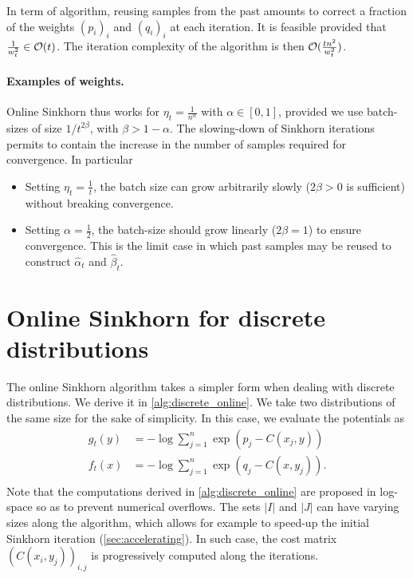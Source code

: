 In term of algorithm, reusing samples from the past amounts to correct a fraction of the weights
$(p_i)_i$ and $(q_i)_i$ at each iteration. It is feasible provided that $\frac{1}{w_t^2} \in \mathcal{O}(t)$. The iteration complexity of the algorithm is then
$\mathcal{O}(\frac{t n^2}{w_t^2})$.

\paragraph{Examples of weights.}

Online Sinkhorn thus works for  $\eta_t = \frac{1}{n^\alpha}$ with $\alpha \in
[0, 1]$, provided we use batch-sizes of size $1 / t^{2\beta}$, with $\beta
> 1 - \alpha$. The slowing-down of Sinkhorn iterations permits to contain the
increase in the number of samples required for convergence. In particular
\begin{itemize}
    \item Setting $\eta_t = \frac{1}{t}$, the batch size can grow arbitrarily slowly ($2
    \beta > 0$ is sufficient) without breaking convergence. 
    \item Setting $\alpha = \frac{1}{2}$, the batch-size should grow linearly
    ($2 \beta = 1$) to ensure convergence. This is the limit case in which past
    samples may be reused to construct $\hat \alpha_t$ and $\hat \beta_t$.
\end{itemize}

\section{Online Sinkhorn for discrete distributions}\label{sec:sinkhorn_discrete}

The online Sinkhorn algorithm takes a simpler form when dealing with discrete
distributions. We derive it in \autoref{alg:discrete_online}. We take two
distributions of the same size for the sake of simplicity. In this case, we evaluate the potentials as
\begin{align}
    g_t(y) &= - \log \sum_{j=1}^n \exp(p_j - C(x_j, y)) \\
    f_t(x) &= - \log \sum_{j=1}^n \exp(q_j - C(x, y_j)). \\
\end{align}
Note that the computations derived in \autoref{alg:discrete_online} are proposed
in log-space so as to prevent numerical overflows. The sets $|I|$ and $|J|$ can
have varying sizes along the algorithm, which allows for example to speed-up the
initial Sinkhorn iteration (\autoref{sec:accelerating}). In such case, the
cost matrix $(C(x_i,y_j))_{i,j}$ is progressively computed along the iterations.


